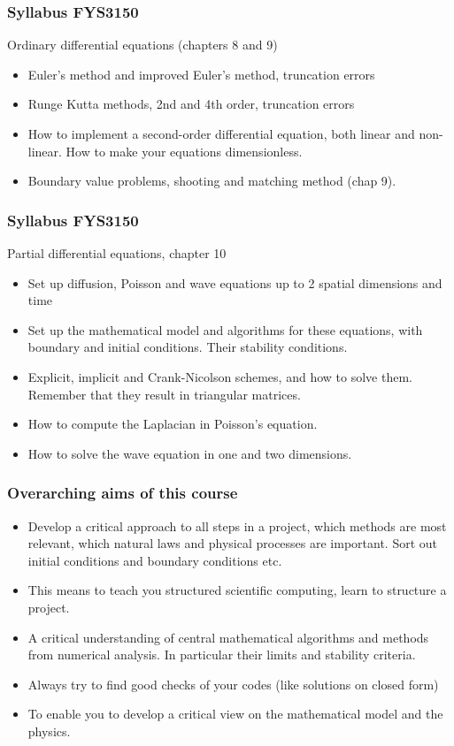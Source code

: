 \documentclass[compress]{beamer}
\begin{document}
\frame
{
  \frametitle{Syllabus FYS3150}
  \begin{block}{Ordinary differential equations (chapters 8 and 9)}
\begin{itemize}
\item Euler's method and improved Euler's method, truncation errors
\item Runge Kutta methods, 2nd and 4th order, truncation errors
\item How to implement a second-order differential equation,
both linear and non-linear. How to make your equations dimensionless.
\item Boundary value problems, shooting and matching method (chap 9).
\end{itemize}
  \end{block}
}


\frame
{
  \frametitle{Syllabus FYS3150}
  \begin{block}{Partial differential equations, chapter 10}
\begin{itemize}
\item Set up diffusion, Poisson and wave equations up to 2
spatial dimensions and time
\item Set up the mathematical model and algorithms for these equations,
with boundary and initial conditions. Their stability conditions.
\item Explicit, implicit and Crank-Nicolson schemes, and how to solve them.
Remember that they result in triangular matrices.
\item How to compute the Laplacian in Poisson's equation.
\item How to solve the wave equation in one and two dimensions.
\end{itemize}
  \end{block}
}



\frame
{
  \frametitle{Overarching aims of this course}
\begin{itemize}
\item Develop a  critical approach to all steps in  a project, which methods are
most relevant, which natural laws and physical processes are important. Sort out initial conditions and boundary conditions etc.
\item This means to teach you structured scientific computing, learn to structure a project.
\item A critical understanding of central mathematical algorithms and methods
from numerical analysis. In particular their limits and stability criteria.
\item Always try to find good checks of your codes (like solutions on closed form)
\item To enable you to develop a  critical view on the mathematical model and the physics.
\end{itemize}
}
\end{document}
